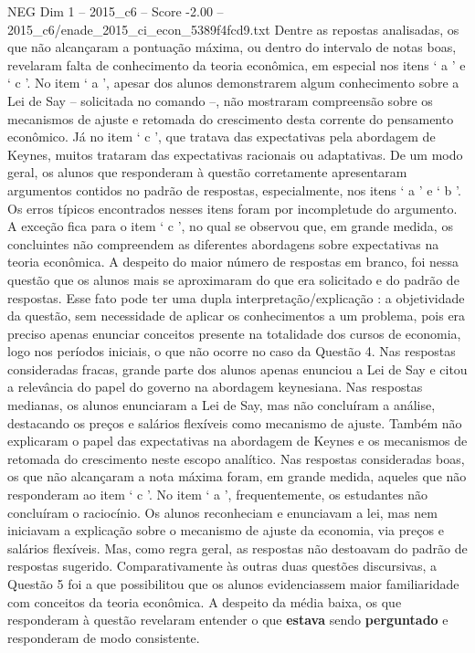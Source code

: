 \begin{textsample}{NEG Dim 1 – 2015\_c6 – Score -2.00 – 2015\_c6/enade\_2015\_ci\_econ\_5389f4fcd9.txt}
Dentre as repostas analisadas, os que não alcançaram a pontuação máxima, ou dentro do intervalo de notas boas, revelaram falta de conhecimento da teoria econômica, em especial nos itens ‘ a ’ e ‘ c ’.
No item ‘ a ’, apesar dos alunos demonstrarem algum conhecimento sobre a Lei de Say – solicitada no comando –, não mostraram compreensão sobre os mecanismos de ajuste e retomada do crescimento desta corrente do pensamento econômico.
Já no item ‘ c ’, que tratava das expectativas pela abordagem de Keynes, muitos trataram das expectativas racionais ou adaptativas.
De um modo geral, os alunos que responderam à questão corretamente apresentaram argumentos contidos no padrão de respostas, especialmente, nos itens ‘ a ’ e ‘ b ’.
Os erros típicos encontrados nesses itens foram por incompletude do argumento.
A exceção fica para o item ‘ c ’, no qual se observou que, em grande medida, os concluintes não compreendem as diferentes abordagens sobre expectativas na teoria econômica.
A despeito do maior número de respostas em branco, foi nessa questão que os alunos mais se aproximaram do que era solicitado e do padrão de respostas.
Esse fato pode ter uma dupla interpretação/explicação : a objetividade da questão, sem necessidade de aplicar os conhecimentos a um problema, pois era preciso apenas enunciar conceitos presente na totalidade dos cursos de economia, logo nos períodos iniciais, o que não ocorre no caso da Questão 4.
Nas respostas consideradas fracas, grande parte dos alunos apenas enunciou a Lei de Say e citou a relevância do papel do governo na abordagem keynesiana.
Nas respostas medianas, os alunos enunciaram a Lei de Say, mas não concluíram a análise, destacando os preços e salários flexíveis como mecanismo de ajuste.
Também não explicaram o papel das expectativas na abordagem de Keynes e os mecanismos de retomada do crescimento neste escopo analítico.
Nas respostas consideradas boas, os que não alcançaram a nota máxima foram, em grande medida, aqueles que não responderam ao item ‘ c ’.
No item ‘ a ’, frequentemente, os estudantes não concluíram o raciocínio.
Os alunos reconheciam e enunciavam a lei, mas nem iniciavam a explicação sobre o mecanismo de ajuste da economia, via preços e salários flexíveis.
Mas, como regra geral, as respostas não destoavam do padrão de respostas sugerido.
Comparativamente às outras duas questões discursivas, a Questão 5 foi a que possibilitou que os alunos evidenciassem maior familiaridade com conceitos da teoria econômica.
A despeito da média baixa, os que responderam à questão revelaram entender o que \textbf{estava} sendo \textbf{perguntado} e responderam de modo consistente.

\end{textsample}
